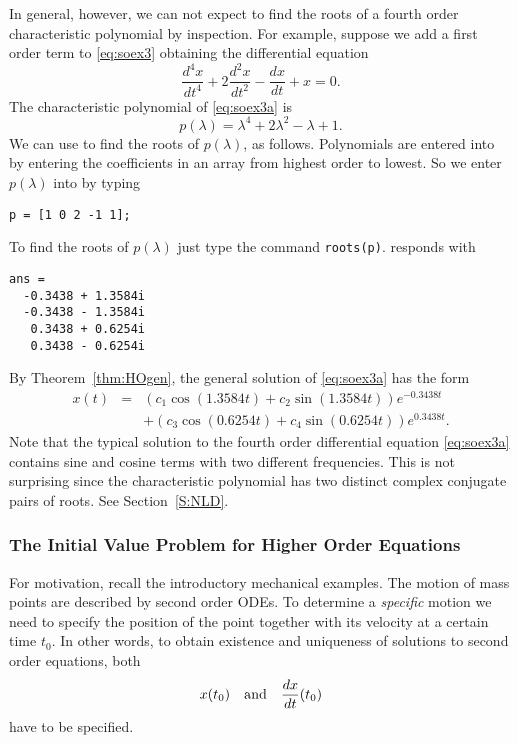 \documentclass{ximera}
\begin{document}
In general, however, we can not expect to find the roots of a fourth order
characteristic polynomial by inspection.  For example, suppose we add a first
order term to \eqref{eq:soex3} obtaining the differential equation
\begin{equation}  \label{eq:soex3a}
\frac{d^4x}{dt^4} + 2\frac{d^2x}{dt^2} - \frac{dx}{dt} + x= 0.
\end{equation}
The characteristic polynomial of \eqref{eq:soex3a} is
\[
p(\lambda) = \lambda^4 + 2\lambda^2 - \lambda + 1 .
\]
We can use \Matlab to find the roots of $p(\lambda)$, as follows. 
Polynomials are entered into \Matlab by entering the coefficients in an array
from highest order to lowest.  So we enter $p(\lambda)$ into \Matlab by
typing
\begin{verbatim}
p = [1 0 2 -1 1];
\end{verbatim}
To find the roots of $p(\lambda)$ just type the command {\tt roots(p)}.
\Matlab responds with 
\begin{verbatim}
ans =
  -0.3438 + 1.3584i
  -0.3438 - 1.3584i
   0.3438 + 0.6254i
   0.3438 - 0.6254i
\end{verbatim}
By Theorem~\ref{thm:HOgen}, the general solution of \eqref{eq:soex3a} has the 
form
\[
\begin{array}{rcl}
x(t) & = & (c_1 \cos(1.3584t)+ c_2 \sin(1.3584t))e^{-0.3438t} \\
 & & + (c_3 \cos(0.6254t)+ c_4 \sin(0.6254t))e^{0.3438t}.\end{array}
\]
Note that the typical solution to the fourth order differential equation 
\eqref{eq:soex3a} contains sine and cosine terms with two different 
frequencies.  This is not surprising since the characteristic polynomial 
has two distinct complex conjugate pairs of roots.  See Section~\ref{S:NLD}.


\subsubsection*{The Initial Value Problem for Higher Order Equations}

For motivation, recall the introductory mechanical examples.  The motion 
of mass points are described by second order ODEs.  To determine a 
{\em specific\/} motion we need to specify the position of the point 
together with its velocity at a certain time $t_0$.  In other words, to 
obtain existence and uniqueness of solutions to second order equations, 
both
\[
x(t_0)\quad\mbox{and}\quad \frac{dx}{dt}(t_0)
\]
have to be specified.  
\end{document}
